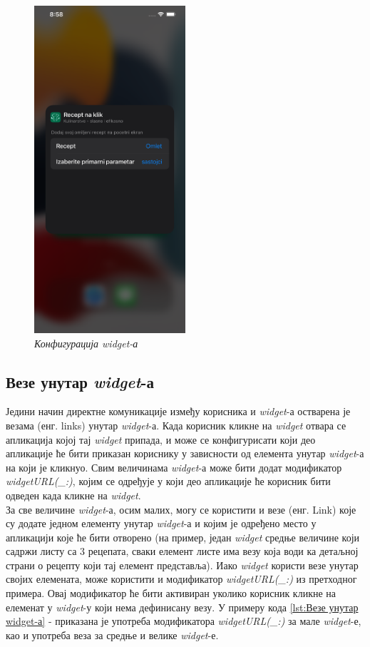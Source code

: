 \documentclass[12pt,oneside]{memoir}
\begin{document}
\begin{figure}[H]
\includegraphics[width=0.5\textwidth]{images/Widget_configuration.png}
\centering
\caption{\textit{Конфигурација widget-а}}
\label{slika:widget_configuration}
\end{figure}

\subsection{Везе унутар \textit{widget}-а}
\indent Једини начин директне комуникације између корисника и \textit{widget}-а остварена је везама (енг. links) унутар \textit{widget}-а. Када корисник кликне на \textit{widget} отвара се апликација којој тај \textit{widget} припада, и може се конфигурисати који део апликације ће бити приказан кориснику у зависности од елемента унутар \textit{widget}-а на који је кликнуо. Свим величинама \textit{widget}-а може бити додат модификатор \textit{widgetURL(\_:)}, којим се одређује у који део апликације ће корисник бити одведен када кликне на \textit{widget}.
\\
\indent За све величине \textit{widget}-а, осим малих, могу се користити и везе (енг. Link) које су додате једном елементу унутар \textit{widget}-а и којим је одређено место у апликацији које ће бити отворено (на пример, један \textit{widget} средње величине који садржи листу са 3 рецепата, сваки елемент листе има везу која води ка детаљној страни о рецепту који тај елемент представља). Иако \textit{widget} користи везе унутар својих елемената, може користити и модификатор \textit{widgetURL(\_:)} из претходног примера. Овај модификатор ће бити активиран уколико корисник кликне на елеменат у \textit{widget}-у који нема дефинисану везу. У примеру кода \ref{lst:Везе унутар widget-а} -  приказана је употреба модификатора \textit{widgetURL(\_:)} за мале \textit{widget}-е, као и употреба веза за средње и велике \textit{widget}-е.
\end{document}
